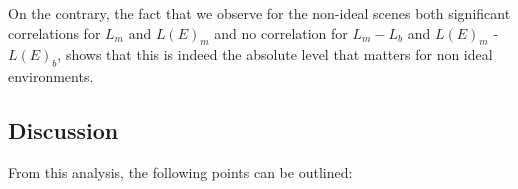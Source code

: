 \documentclass[12pt]{elsarticle}
\begin{document}

On the contrary, the fact that we observe for the non-ideal scenes both significant correlations for $L_m$ and $L(E)_m$ and no correlation for $L_m-L_b$ and $L(E)_m$ - $L(E)_b$, shows that this is indeed the absolute level that matters for non ideal environments.


\subsection{Discussion}


From this analysis, the following points can be outlined:
\end{document}

